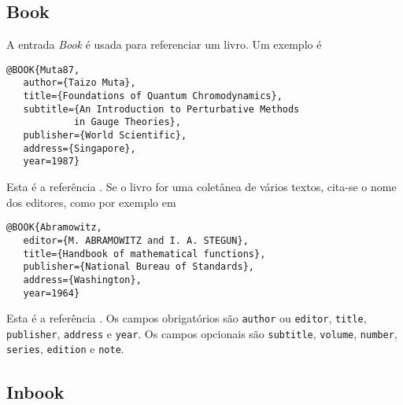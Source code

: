 \documentclass[a4paper,12pt]{article}
\newcommand{\ii}{\'{\i}}
\newcommand{\enf}{\em}
\begin{document}
\subsection*{Book}

A entrada {\enf Book} \'e usada para referenciar um livro.
Um exemplo \'e
\begin{verbatim}
@BOOK{Muta87,
   author={Taizo Muta},
   title={Foundations of Quantum Chromodynamics},
   subtitle={An Introduction to Perturbative Methods
            in Gauge Theories},
   publisher={World Scientific},
   address={Singapore},
   year=1987}
\end{verbatim}
Esta \'e a refer\^encia \cite{Muta87}. Se o livro for
uma colet\^anea de v\'arios textos, cita-se o nome dos editores, 
como por exemplo em
\begin{verbatim}
@BOOK{Abramowitz,
   editor={M. ABRAMOWITZ and I. A. STEGUN},
   title={Handbook of mathematical functions},
   publisher={National Bureau of Standards},
   address={Washington},
   year=1964}
\end{verbatim}
Esta \'e a refer\^encia \cite{Abramowitz}.
Os campos obrigat\'orios s\~ao \verb+author+ ou \verb+editor+,
\verb+title+, \verb+publisher+, \verb+address+ e \verb+year+.
Os campos opcionais s\~ao \verb+subtitle+, \verb+volume+, \verb+number+,
\verb+series+, \verb+edition+ e \verb+note+.


\begin{comment}
\subsection*{Booklet}

A entrada {\enf booklet} \'e usada para referenciar livros publicados
sem aux{\ii}lio de editora.
Sua forma geral \'e \cite{}
\begin{verbatim}
\end{verbatim}



\subsection*{Conference}

\'E o mesmo que a entrada {\enf Inproceedings}.
\end{comment}



\subsection*{Inbook}
\end{document}
